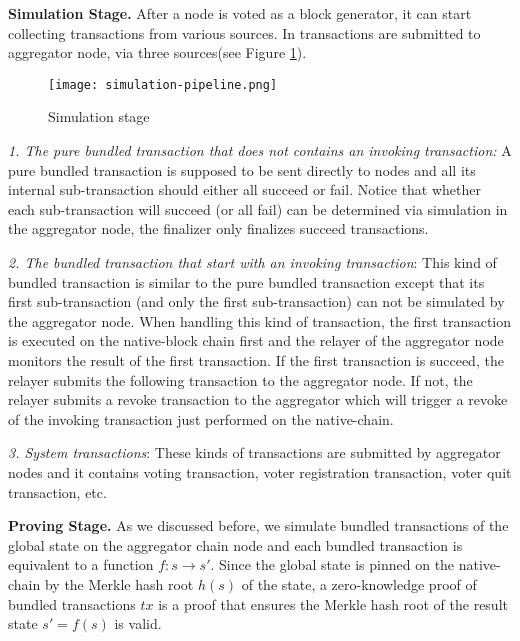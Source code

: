 \smallskip\noindent\textbf{Simulation Stage.}
After a node is voted as a block generator, it can start collecting transactions from various sources. In \dprotocol transactions are submitted to aggregator node, via three sources(see Figure \ref{simulation-stage}).

\begin{figure}[!ht]
\begin{center}
\texttt{[image: simulation-pipeline.png]}
\end{center}
\caption{Simulation stage}
\label{simulation-stage}
\end{figure}

\noindent\textit{1. The pure bundled transaction that does not contains an invoking transaction:} A pure bundled transaction is supposed to be sent directly to \dprotocol nodes and all its internal sub-transaction should either all succeed or fail. Notice that whether each sub-transaction will succeed (or all fail) can be determined via simulation in the aggregator node, the finalizer only finalizes succeed transactions.

\noindent\textit{2. The bundled transaction that start with an invoking transaction}: This kind of bundled transaction is similar to the pure bundled transaction except that its first sub-transaction (and only the first sub-transaction) can not be simulated by the aggregator node. When handling this kind of transaction, the first transaction is executed on the native-block chain first and the relayer of the aggregator node monitors the result of the first transaction. If the first transaction is succeed, the relayer submits the following transaction to the aggregator node. If not, the relayer submits a revoke transaction to the aggregator which will trigger a revoke of the invoking transaction just performed on the native-chain.

\noindent\textit{3. System transactions}: These kinds of transactions are submitted by aggregator nodes and it contains voting transaction, voter registration transaction, voter quit transaction, etc.

\smallskip\noindent\textbf{Proving Stage.}
As we discussed before, we simulate bundled transactions of the global state on the aggregator chain node and each bundled transaction is equivalent to a function $f: s \rightarrow s'$. Since the global state is pinned on the native-chain by the Merkle hash root $h(s)$ of the state, a zero-knowledge proof of bundled transactions $tx$ is a proof that ensures the Merkle hash root of the result state $s' = f(s)$ is valid. 

